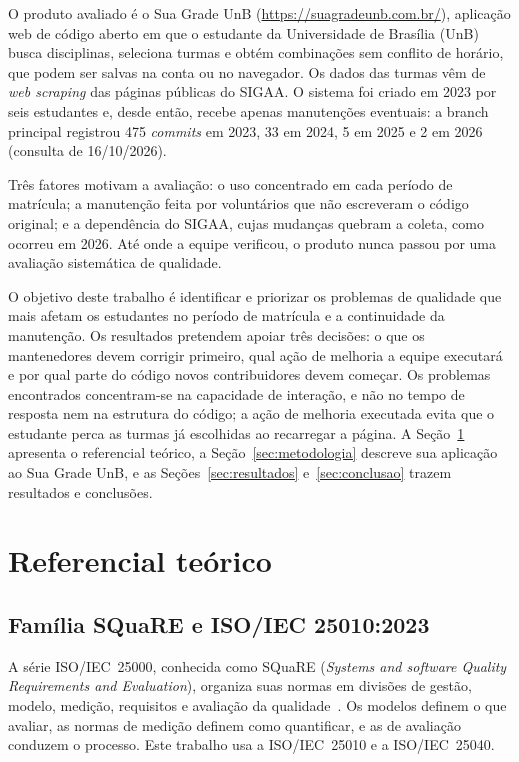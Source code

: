 \documentclass[12pt]{article}
\begin{document}
O produto avaliado é o Sua Grade UnB (\url{https://suagradeunb.com.br/}),
aplicação web de código aberto em que o estudante da Universidade de Brasília
(UnB) busca disciplinas, seleciona turmas e obtém combinações sem conflito de
horário, que podem ser salvas na conta ou no navegador. Os dados das turmas vêm
de \textit{web scraping} das páginas públicas do SIGAA. O sistema foi criado em
2023 por seis estudantes e, desde então, recebe apenas manutenções eventuais:
a branch principal registrou 475 \textit{commits} em 2023, 33 em 2024, 5 em 2025
e 2 em 2026 (consulta de 16/10/2026).

Três fatores motivam a avaliação: o uso concentrado em cada período de
matrícula; a manutenção feita por voluntários que não escreveram o código
original; e a dependência do SIGAA, cujas mudanças quebram a coleta, como
ocorreu em 2026. Até onde a equipe verificou, o produto nunca passou por uma
avaliação sistemática de qualidade.

O objetivo deste trabalho é identificar e priorizar os problemas de qualidade
que mais afetam os estudantes no período de matrícula e a continuidade da
manutenção. Os resultados pretendem apoiar três decisões: o que os mantenedores
devem corrigir primeiro, qual ação de melhoria a equipe executará e por qual
parte do código novos contribuidores devem começar.
Os problemas encontrados concentram-se na capacidade de interação, e não no
tempo de resposta nem na estrutura do código; a ação de melhoria executada
evita que o estudante perca as turmas já escolhidas ao recarregar a página.
A Seção~\ref{sec:referencial}
apresenta o referencial teórico, a Seção~\ref{sec:metodologia} descreve sua
aplicação ao Sua Grade UnB, e as Seções~\ref{sec:resultados}
e~\ref{sec:conclusao} trazem resultados e conclusões.

\section{Referencial teórico}\label{sec:referencial}

\subsection{Família SQuaRE e ISO/IEC 25010:2023}\label{subsec:iso25010}

A série ISO/IEC~25000, conhecida como SQuaRE (\textit{Systems and software
Quality Requirements and Evaluation}), organiza suas normas em divisões de
gestão, modelo, medição, requisitos e avaliação da
qualidade~\cite{iso25000}. Os modelos definem o que avaliar, as normas de
medição definem como quantificar, e as de avaliação conduzem o processo. Este
trabalho usa a ISO/IEC~25010 e a ISO/IEC~25040.
\end{document}
